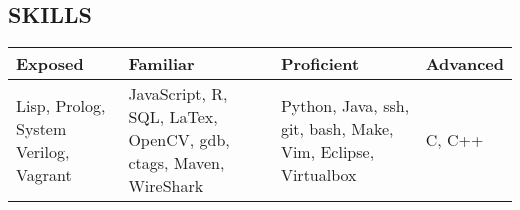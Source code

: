 \documentclass[10pt, letterpaper]{res}
\begin{document}
\begin{resume}
\section{SKILLS}
	\vspace{2mm}
	\begin{tabularx}{\textwidth}{|X|X|X|X|}
		\hline		
		Exposed & Familiar & Proficient & Advanced \\ \hline
		Lisp, Prolog, System Verilog, Vagrant &
		JavaScript, R, SQL, LaTex, OpenCV, gdb, ctags, Maven, WireShark &
		Python, Java, ssh, git, bash, Make, Vim, Eclipse, Virtualbox &
		C, C++ \\
		\hline
	\end{tabularx} \\



\end{resume}
\end{document}
